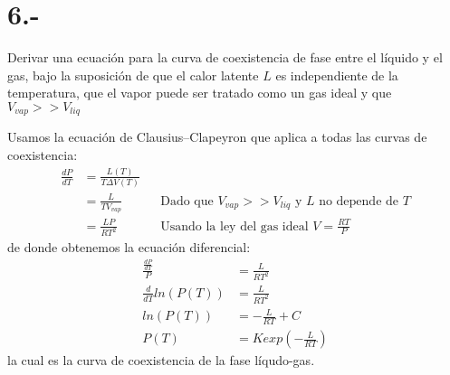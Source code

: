 \documentclass{article}
\begin{document}
\section*{6.-}
Derivar una ecuación para la curva de coexistencia de fase entre el líquido y el gas, bajo la suposición de que el calor latente 
$L$ es independiente de la temperatura, que el vapor puede ser tratado como un gas ideal y que $V_{vap} >> V_{liq}$
\begin{tcolorbox}[breakable]
Usamos la ecuación de Clausius–Clapeyron que aplica a todas las curvas de coexistencia:
\begin{align*}
    \frac{dP}{dT} 
    &= \frac{L(T)}{T\Delta V(T)} \\
    &= \frac{L}{TV_{vap}} && \text{Dado que $V_{vap} >> V_{liq}$ y $L$ no depende de $T$} \\
    &= \frac{LP}{RT^2} && \text{Usando la ley del gas ideal $V = \frac{RT}{P}$} 
\end{align*}
de donde obtenemos la ecuación diferencial:
\begin{align*}
    \frac{\tfrac{dP}{dT}}{P} 
    &= \frac{L}{RT^2} \\ 
    \frac{d}{dT}ln(P(T)) &= \frac{L}{RT^2} \\
    ln(P(T)) &= -\frac{L}{RT}+C \\
    P(T) &= Kexp(-\tfrac{L}{RT})  
\end{align*}
la cual es la curva de coexistencia de la fase líqudo-gas.
\end{tcolorbox}
\end{document}
